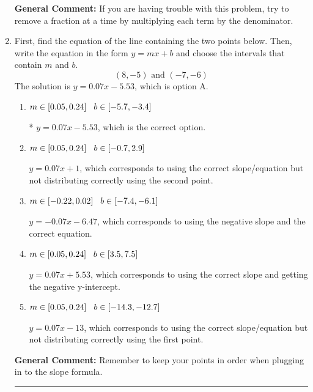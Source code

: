 \documentclass{extbook}[14pt]
\newcommand{\litem}[1]{\item #1

\rule{\textwidth}{0.4pt}}
\begin{document}
\begin{enumerate}
{\textbf{General Comment:} If you are having trouble with this problem, try to remove a fraction at a time by multiplying each term by the denominator.
}
\litem{
First, find the equation of the line containing the two points below. Then, write the equation in the form $ y=mx+b $ and choose the intervals that contain $m$ and $b$.
\[ (8, -5) \text{ and } (-7, -6) \]The solution is \( y = 0.07x -5.53 \), which is option A.\begin{enumerate}[label=\Alph*.]
\item \( m \in [0.05, 0.24] \hspace*{3mm} b \in [-5.7, -3.4] \)

* $y = 0.07x -5.53$, which is the correct option.
\item \( m \in [0.05, 0.24] \hspace*{3mm} b \in [-0.7, 2.9] \)

 $y = 0.07x + 1$, which corresponds to using the correct slope/equation but not distributing correctly using the second point.
\item \( m \in [-0.22, 0.02] \hspace*{3mm} b \in [-7.4, -6.1] \)

 $y = -0.07x -6.47$, which corresponds to using the negative slope and the correct equation.
\item \( m \in [0.05, 0.24] \hspace*{3mm} b \in [3.5, 7.5] \)

 $y = 0.07x + 5.53$, which corresponds to using the correct slope and getting the negative y-intercept.
\item \( m \in [0.05, 0.24] \hspace*{3mm} b \in [-14.3, -12.7] \)

 $y = 0.07x -13$, which corresponds to using the correct slope/equation but not distributing correctly using the first point.
\end{enumerate}

\textbf{General Comment:} Remember to keep your points in order when plugging in to the slope formula.
}
\end{enumerate}
\end{document}
